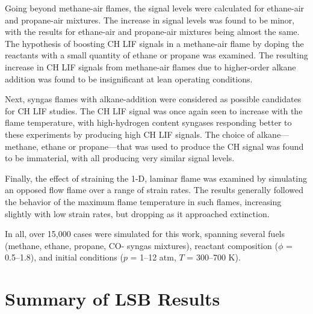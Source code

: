 Going beyond methane-air flames, the signal levels were calculated for ethane-air and propane-air mixtures.
The increase in signal levels was found to be minor, with the results for ethane-air and propane-air mixtures being almost the same.
The hypothesis of boosting CH LIF signals in a methane-air flame by doping the reactants with a small quantity of ethane or propane was examined.
The resulting increase in CH LIF signals from methane-air flames due to higher-order alkane addition was found to be insignificant at lean operating conditions.

Next, syngas flames with alkane-addition were considered as possible candidates for CH LIF studies.
The CH LIF signal was once again seen to increase with the flame temperature, with high-hydrogen content syngases responding better to these experiments by producing high CH LIF signals.
The choice of alkane---methane, ethane or propane---that was used to produce the CH signal was found to be immaterial, with all producing very similar signal levels.

Finally, the effect of straining the 1-D, laminar flame was examined by simulating an opposed flow flame over a range of strain rates.
The results generally followed the behavior of the maximum flame temperature in such flames, increasing slightly with low strain rates, but dropping as it approached extinction.

In all, over 15,000 cases were simulated for this work, spanning several fuels (methane, ethane, propane, CO- syngas mixtures), reactant composition (\(\phi\) = 0.5--1.8), and initial conditions (\(p\) = 1--12 atm, \(T\) = 300--700 K).

\section{Summary of LSB Results}

